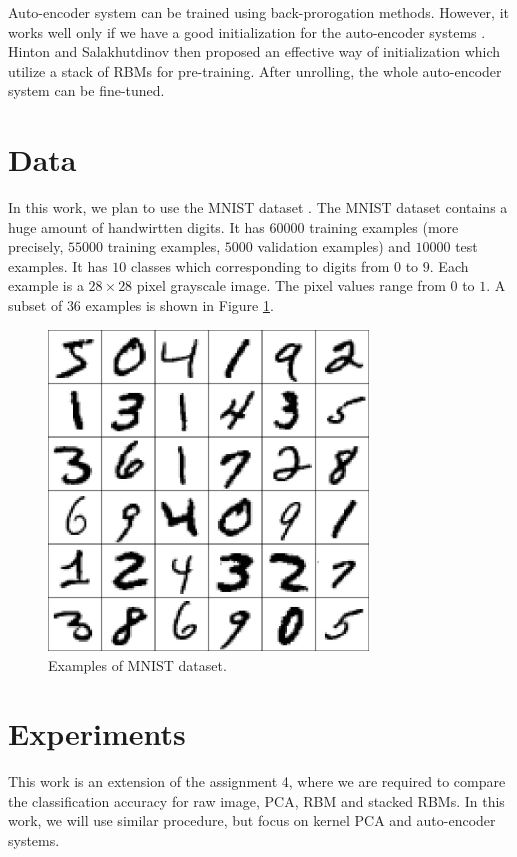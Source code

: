 \documentclass{article}
\begin{document}
Auto-encoder system can be trained using back-prorogation methods. However, it works well only if we have a good initialization for the auto-encoder systems \cite{hinton2006reducing}. Hinton and Salakhutdinov \cite{hinton2006reducing} then proposed an effective way of initialization which utilize a stack of RBMs for pre-training. After unrolling, the whole auto-encoder system can be fine-tuned.

\section{Data}
\label{sec:data}

In this work, we plan to use the MNIST dataset \cite{lecun1998gradient}. The MNIST dataset contains a huge amount of handwirtten digits. It has $60000$ training examples (more precisely, $55000$ training examples, $5000$ validation examples) and $10000$ test examples. It has $10$ classes which corresponding to digits from $0$ to $9$. Each example is a $28 \times 28$ pixel grayscale image. The pixel values range from $0$ to $1$. A subset of $36$ examples is shown in Figure \ref{fig:filter}.

\begin{figure}[htb]
\centering
\includegraphics[width=8.5cm]{./figures/filter.pdf}
\caption{Examples of MNIST dataset.}
\label{fig:filter}
\end{figure}

\section{Experiments}
\label{sec:experiment}

This work is an extension of the assignment 4, where we are required to compare the classification accuracy for raw image, PCA, RBM and stacked RBMs. In this work, we will use similar procedure, but focus on kernel PCA and auto-encoder systems.
\end{document}
